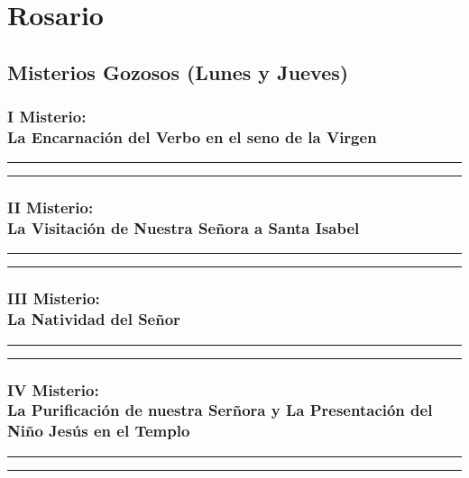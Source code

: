 \documentclass[11pt,a4paper]{report}
\begin{document}
    \section*{Rosario}

    
    
    \subsection*{Misterios Gozosos (Lunes y Jueves)}

    \subsubsection*{I Misterio:\\ La Encarnación del Verbo en el seno de la Virgen}
    
    
    \rule{\textwidth}{0.5pt}
    
    \rule{\textwidth}{0.5pt}
    

    \subsubsection*{II Misterio:\\ La Visitación de Nuestra Señora a Santa Isabel}
    
    
    \rule{\textwidth}{0.5pt}
    
    \rule{\textwidth}{0.5pt}
    

    \subsubsection*{III Misterio:\\ La Natividad del Señor}
    
    
    \rule{\textwidth}{0.5pt}
    
    \rule{\textwidth}{0.5pt}
    

    \subsubsection*{IV Misterio:\\ La Purificación de nuestra Serñora y La Presentación del Niño Jesús en el Templo}
    
    
    \rule{\textwidth}{0.5pt}
    
    \rule{\textwidth}{0.5pt}
    
\end{document}
